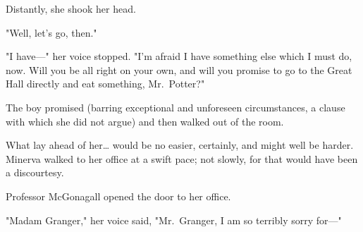 Distantly, she shook her head.

"Well, let's go, then."

"I have---" her voice stopped. "I'm afraid I have something else which I must
do, now. Will you be all right on your own, and will you promise to go to the
Great Hall directly and eat something, Mr.~Potter?"

The boy promised (barring exceptional and unforeseen circumstances, a clause
with which she did not argue) and then walked out of the room.

What lay ahead of her{\ldots} would be no easier, certainly, and might well be
harder.
\later
Minerva walked to her office at a swift pace; not slowly, for that would have
been a discourtesy.

Professor McGonagall opened the door to her office.

"Madam Granger," her voice said, "Mr.~Granger, I am so terribly sorry for---"
